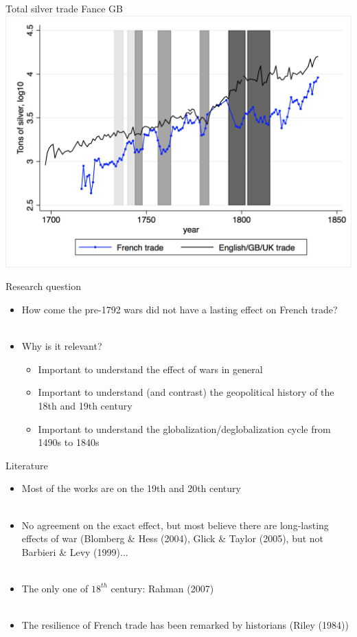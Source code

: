 \documentclass[11pt]{beamer}
\begin{document}
\begin{frame}{Total silver trade Fance GB}
\includegraphics[scale=.5]{Total_silver_trade_FRGB.png}
\end{frame}

\begin{frame}{Research question}
\begin{itemize}
\item{How come the pre-1792 wars did not have a lasting effect on French trade?}\\~\\
\item{Why is it relevant?}
\begin{itemize}
\item{Important to understand the effect of wars in general}
\item{Important to understand (and contrast) the geopolitical history of the 18th and 19th century}
\item{Important to understand the globalization/deglobalization cycle from 1490s to 1840s}
\end{itemize}
\end{itemize}
\end{frame}



\begin{frame}{Literature}
\begin{itemize}
\item{Most of the works are on the 19th and 20th century}\\~\\
\item{No agreement on the exact effect, but most believe there are long-lasting effects of war (Blomberg \& Hess (2004), Glick \& Taylor (2005), but not Barbieri \& Levy (1999)...}\\~\\
\item{The only one of $18^{th}$ century: Rahman (2007)}\\~\\
\item{The resilience of French trade has been remarked by historians (Riley (1984))}
\end{itemize}
\end{frame}
\end{document}
